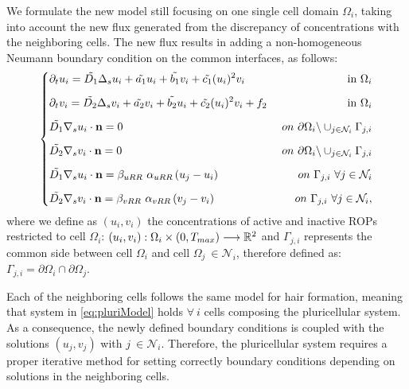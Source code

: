 \documentclass[a4paper]{siamonline220329}
\begin{document}
We formulate the new model still focusing on one single cell domain $\Omega_i$, taking into account the new flux generated from the discrepancy of concentrations with the neighboring cells. The new flux results in adding a non-homogeneous Neumann boundary condition on the common interfaces, as follows:
\begin{equation} \label{eq:pluriModel}
\left\lbrace
\begin{matrix}
  \begin{aligned}
    & \partial_t u_i = \Tilde{D_1} \Delta_s u_i + \Tilde{a_1} u_i + \Tilde{b_1} v_i + \Tilde{c_1} (u_i)^2 v_i & \ \text{in} \ \Omega_i\\[6pt]
    & \partial_t v_i = \Tilde{D_2} \Delta_s v_i + \Tilde{a_2} v_i + \Tilde{b_2} u_i + \Tilde{c_2} (u_i)^2 v_i + f_2 & \ \text{in} \ \Omega_i \\[6pt]
    & \Tilde{D_1} \nabla_s u_i \cdot \mathbf{n} = 0 & \ on \ \partial \Omega_i \backslash \cup_{j \in \mathcal{N}_i} \Gamma_{j,i} \\[6pt]
    & \Tilde{D_2} \nabla_s v_i \cdot \mathbf{n} = 0 & \ on \ \partial \Omega_i \backslash \cup_{j \in \mathcal{N}_i} \Gamma_{j,i} \\[6pt]
    & \Tilde{D_1} \nabla_s u_i \cdot \mathbf{n} = \beta_{uRR} \ \alpha_{uRR} \left(u_j - u_i \right) & \ on \ \Gamma_{j,i} \ \forall j \in  \mathcal{N}_i \\[6pt]
    & \Tilde{D_2} \nabla_s v_i \cdot \mathbf{n} = \beta_{vRR} \ \alpha_{vRR} \left(v_j - v_i \right) & \ on \ \Gamma_{j,i}\ \forall j \in  \mathcal{N}_i ,
  \end{aligned}
\end{matrix}
\right.
\end{equation}
where we define as $(u_i, v_i)$ the concentrations of active and inactive ROPs restricted to cell $\Omega_i$: $(u_i, v_i): \Omega_i \times \left(0, T_{max} \right) \longrightarrow \mathbb{R}^2$ and $\Gamma_{j,i}$ represents the common side between cell $\Omega_i$ and cell $\Omega_j \ \in \mathcal{N}_i $, therefore defined as: $\Gamma_{j,i} = \partial \Omega_i \cap \partial \Omega_j$.

Each of the neighboring cells follows the same model for hair formation, meaning that system in \eqref{eq:pluriModel} holds $\forall \ i$ cells composing the pluricellular system. As a consequence, the newly defined boundary conditions is coupled with the solutions $(u_j, v_j)$ with $j \ \in \mathcal{N}_i$. Therefore, the pluricellular system requires a proper iterative method for setting correctly boundary conditions depending on solutions in the neighboring cells.
\end{document}
